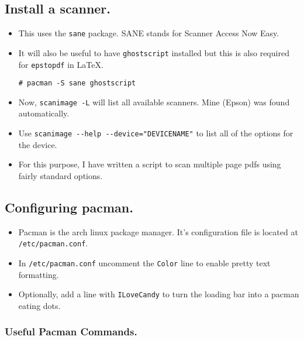 \documentclass{article}
\begin{document}
  \subsection{Install a scanner.}

  \begin{itemize}
    \item This uses the \verb|sane| package.
      SANE stands for Scanner Access Now Easy.
    \item It will also be useful to have \verb|ghostscript| installed but this is also required for \verb|epstopdf| in \LaTeX.
\begin{verbatim}
# pacman -S sane ghostscript
\end{verbatim}
    \item Now, \verb|scanimage -L| will list all available scanners.
      Mine (Epson) was found automatically.
    \item Use \verb|scanimage --help --device="DEVICENAME"| to list all of the options for the device.
    \item For this purpose, I have written a script to scan multiple page pdfs using fairly standard options.
  \end{itemize}

  \subsection{Configuring pacman.}

  \begin{itemize}
    \item Pacman is the arch linux package manager.
      It's configuration file is located at \verb|/etc/pacman.conf|.
    \item In \verb|/etc/pacman.conf| uncomment the \verb|Color| line to enable pretty text formatting.
    \item Optionally, add a line with \verb|ILoveCandy| to turn the loading bar into a pacman eating dots.
  \end{itemize}

    \subsubsection{Useful Pacman Commands.}
\end{document}
